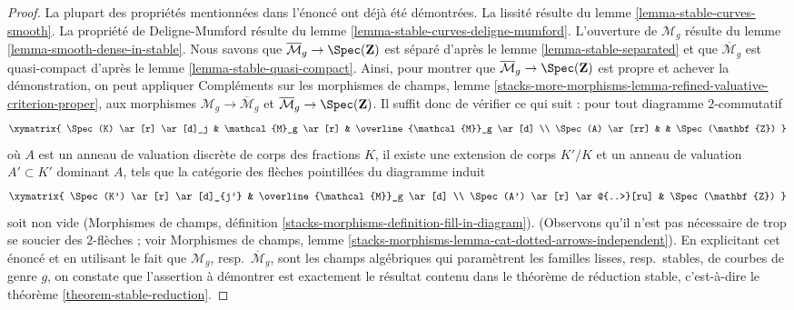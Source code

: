 \begin{proof}
La plupart des propriétés mentionnées dans l'énoncé ont déjà été démontrées.
La lissité résulte du lemme \ref{lemma-stable-curves-smooth}.
La propriété de Deligne-Mumford résulte du lemme \ref{lemma-stable-curves-deligne-mumford}.
L'ouverture de $\mathcal{M}_g$ résulte du lemme \ref{lemma-smooth-dense-in-stable}.
Nous savons que $\overline{\mathcal{M}}_g \to \Spec(\mathbf{Z})$
est séparé d'après le lemme \ref{lemma-stable-separated} et que
$\overline{\mathcal{M}}_g$ est quasi-compact d'après le
lemme \ref{lemma-stable-quasi-compact}.
Ainsi, pour montrer que $\overline{\mathcal{M}}_g \to \Spec(\mathbf{Z})$
est propre et achever la démonstration, on peut appliquer
Compléments sur les morphismes de champs, lemme
\ref{stacks-more-morphisms-lemma-refined-valuative-criterion-proper},
aux morphismes $\mathcal{M}_g \to \overline{\mathcal{M}}_g$ et
$\overline{\mathcal{M}}_g \to \Spec(\mathbf{Z})$.
Il suffit donc de vérifier ce qui suit : pour tout diagramme $2$-commutatif
$$
\xymatrix{
\Spec(K) \ar[r] \ar[d]_j &
\mathcal{M}_g \ar[r] &
\overline{\mathcal{M}}_g \ar[d] \\
\Spec(A) \ar[rr] & & \Spec(\mathbf{Z})
}
$$
où $A$ est un anneau de valuation discrète de corps des fractions $K$, il
existe une extension de corps $K'/K$ et un anneau de valuation $A' \subset K'$
dominant $A$, tels que la catégorie des flèches pointillées du
diagramme induit
$$
\xymatrix{
\Spec(K') \ar[r] \ar[d]_{j'} & \overline{\mathcal{M}}_g \ar[d] \\
\Spec(A') \ar[r] \ar@{..>}[ru] & \Spec(\mathbf{Z})
}
$$
soit non vide (Morphismes de champs, définition
\ref{stacks-morphisms-definition-fill-in-diagram}).
(Observons qu'il n'est pas nécessaire de trop se soucier des
$2$-flèches ; voir Morphismes de champs, lemme
\ref{stacks-morphisms-lemma-cat-dotted-arrows-independent}).
En explicitant cet énoncé et en utilisant le fait que
$\mathcal{M}_g$, resp.\ $\overline{\mathcal{M}}_g$, sont les champs algébriques
qui paramètrent les familles lisses, resp.\ stables, de courbes de genre $g$,
on constate que l'assertion à démontrer est exactement le résultat contenu
dans le théorème de réduction stable, c'est-à-dire le théorème
\ref{theorem-stable-reduction}.
\end{proof}
















